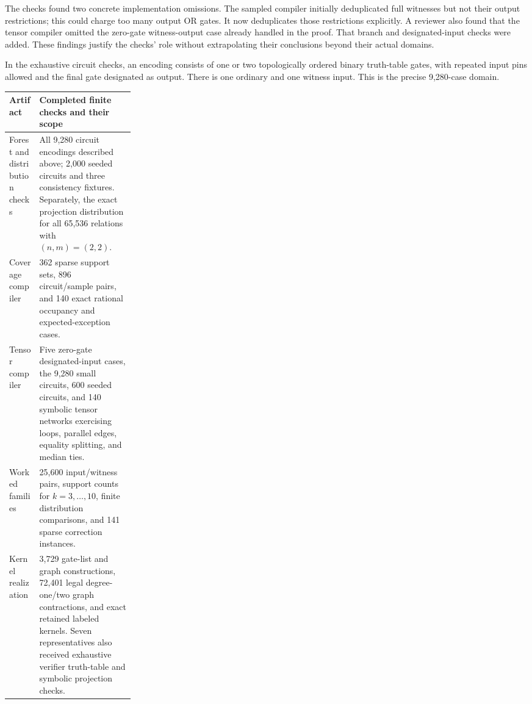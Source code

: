 The checks found two concrete implementation omissions. The sampled
compiler initially deduplicated full witnesses but not their output
restrictions; this could charge too many output OR gates. It now
deduplicates those restrictions explicitly. A reviewer also found that
the tensor compiler omitted the zero-gate witness-output case already
handled in the proof. That branch and designated-input checks were
added. These findings justify the checks' role without extrapolating
their conclusions beyond their actual domains.

\begin{samepage}
In the exhaustive circuit checks, an encoding consists of one or two
topologically ordered binary truth-table gates, with repeated input
pins allowed and the final gate designated as output. There is one
ordinary and one witness input. This is the precise 9,280-case domain.\par
\end{samepage}

\begin{center}\small
\begin{tabularx}{\linewidth}{@{}>{\raggedright\arraybackslash}p{0.24\linewidth}X@{}}
\toprule
Artifact & Completed finite checks and their scope\\
\midrule
Forest and distribution checks & All 9,280 circuit encodings described
above; 2,000 seeded circuits and three consistency fixtures. Separately,
the exact projection distribution for all 65,536 relations with
$(n,m)=(2,2)$.\\
Coverage compiler & 362 sparse support sets, 896 circuit/sample pairs,
and 140 exact rational occupancy and expected-exception cases.\\
Tensor compiler & Five zero-gate designated-input cases, the 9,280
small circuits, 600 seeded circuits, and 140 symbolic tensor networks
exercising loops, parallel edges, equality splitting, and median ties.\\
Worked families & 25,600 input/witness pairs, support counts for
$k=3,\ldots,10$, finite distribution comparisons, and 141 sparse
correction instances.\\
Kernel realization & 3,729 gate-list and graph constructions,
72,401 legal degree-one/two graph contractions, and exact retained
labeled kernels. Seven representatives also received exhaustive
verifier truth-table and symbolic projection checks.\\
\bottomrule
\end{tabularx}
\end{center}

